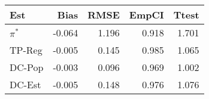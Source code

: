 
\begin{tabular}{lrrrr}
\toprule
Est & Bias & RMSE & EmpCI & Ttest\\
\midrule
$\pi^*$ & -0.064 & 1.196 & 0.918 & 1.701\\
TP-Reg & -0.005 & 0.145 & 0.985 & 1.065\\
DC-Pop & -0.003 & 0.096 & 0.969 & 1.002\\
DC-Est & -0.005 & 0.148 & 0.976 & 1.076\\
\bottomrule
\end{tabular}